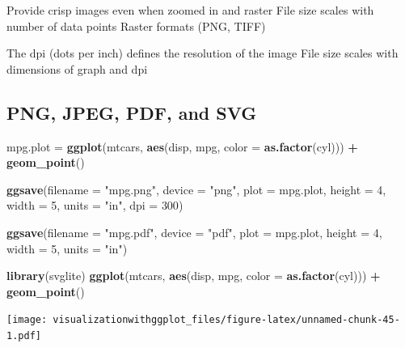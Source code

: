 \documentclass[]{krantz}
\makeatletter
\newenvironment{Shaded}{\begin{snugshade}}{\end{snugshade}}
\newcommand{\DataTypeTok}[1]{\textcolor[rgb]{0.13,0.29,0.53}{#1}}
\newcommand{\DecValTok}[1]{\textcolor[rgb]{0.00,0.00,0.81}{#1}}
\newcommand{\KeywordTok}[1]{\textcolor[rgb]{0.13,0.29,0.53}{\textbf{#1}}}
\newcommand{\NormalTok}[1]{#1}
\newcommand{\OperatorTok}[1]{\textcolor[rgb]{0.81,0.36,0.00}{\textbf{#1}}}
\newcommand{\StringTok}[1]{\textcolor[rgb]{0.31,0.60,0.02}{#1}}
\newenvironment{kframe}{%
\medskip{}
\setlength{\fboxsep}{.8em}
 \def\at@end@of@kframe{}%
 \ifinner\ifhmode%
  \def\at@end@of@kframe{\end{minipage}}%
  \begin{minipage}{\columnwidth}%
 \fi\fi%
 \def\FrameCommand##1{\hskip\@totalleftmargin \hskip-\fboxsep
 \colorbox{shadecolor}{##1}\hskip-\fboxsep
     \hskip-\linewidth \hskip-\@totalleftmargin \hskip\columnwidth}%
 \MakeFramed {\advance\hsize-\width
   \@totalleftmargin\z@ \linewidth\hsize
   \@setminipage}}%
 {\par\unskip\endMakeFramed%
 \at@end@of@kframe}
\renewenvironment{Shaded}{\begin{kframe}}{\end{kframe}}
\makeatother
\begin{document}
Provide crisp images even when zoomed in and raster
File size scales with number of data points
Raster formats (PNG, TIFF)

The dpi (dots per inch) defines the resolution of the image File size scales with dimensions of graph and dpi

\hypertarget{png-jpeg-pdf-and-svg}{%
\subsection{PNG, JPEG, PDF, and SVG}\label{png-jpeg-pdf-and-svg}}

\begin{Shaded}
\begin{Highlighting}[]
\NormalTok{mpg.plot =}\StringTok{ }\KeywordTok{ggplot}\NormalTok{(mtcars, }
    \KeywordTok{aes}\NormalTok{(disp,  mpg, }\DataTypeTok{color =} \KeywordTok{as.factor}\NormalTok{(cyl))) }\OperatorTok{+}\StringTok{ }
\StringTok{    }\KeywordTok{geom_point}\NormalTok{()}

\KeywordTok{ggsave}\NormalTok{(}\DataTypeTok{filename =} \StringTok{"mpg.png"}\NormalTok{, }
    \DataTypeTok{device =} \StringTok{"png"}\NormalTok{,}
    \DataTypeTok{plot =}\NormalTok{ mpg.plot, }\DataTypeTok{height =} \DecValTok{4}\NormalTok{, }\DataTypeTok{width =} \DecValTok{5}\NormalTok{, }\DataTypeTok{units =} \StringTok{"in"}\NormalTok{, }
    \DataTypeTok{dpi =} \DecValTok{300}\NormalTok{)}

\KeywordTok{ggsave}\NormalTok{(}\DataTypeTok{filename =} \StringTok{"mpg.pdf"}\NormalTok{, }\DataTypeTok{device =} \StringTok{"pdf"}\NormalTok{, }
      \DataTypeTok{plot =}\NormalTok{ mpg.plot, }\DataTypeTok{height =} \DecValTok{4}\NormalTok{, }\DataTypeTok{width =} \DecValTok{5}\NormalTok{, }\DataTypeTok{units =} \StringTok{"in"}\NormalTok{)}
\end{Highlighting}
\end{Shaded}

\begin{Shaded}
\begin{Highlighting}[]
\KeywordTok{library}\NormalTok{(svglite)}
\KeywordTok{ggplot}\NormalTok{(mtcars, }\KeywordTok{aes}\NormalTok{(disp,  mpg, }\DataTypeTok{color =} \KeywordTok{as.factor}\NormalTok{(cyl))) }\OperatorTok{+}\StringTok{ }\KeywordTok{geom_point}\NormalTok{()}
\end{Highlighting}
\end{Shaded}

\texttt{[image: visualizationwithggplot\_files/figure-latex/unnamed-chunk-45-1.pdf]}
\end{document}
